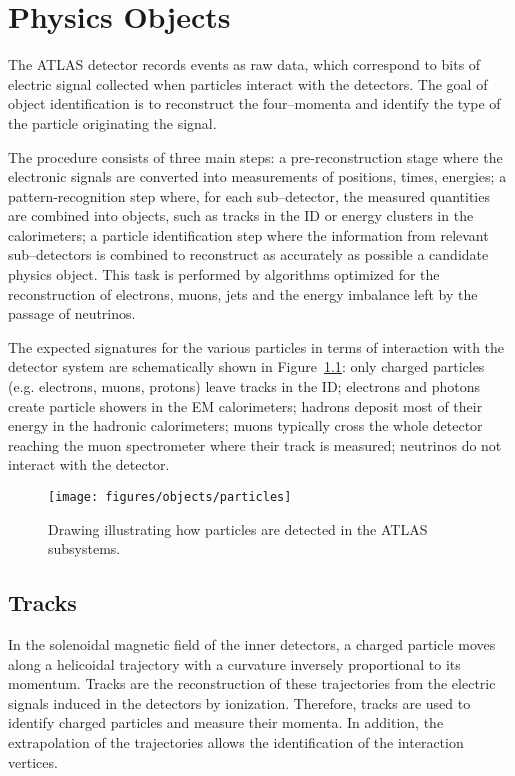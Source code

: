 \chapter{Physics Objects}
\label{sec:objects}

The ATLAS detector records events as raw data, 
which correspond to bits of electric signal collected 
when particles interact with the detectors. 
The goal of object identification is to reconstruct the four--momenta
and identify the type of the particle originating the signal.

The procedure consists of three main steps: a pre-reconstruction stage
where the electronic signals are converted into measurements of
positions, times, energies; a pattern-recognition step where, for each
sub--detector, the measured quantities are combined into objects, such
as tracks in the ID or energy clusters in the calorimeters; a particle
identification step where the information from relevant sub--detectors
is combined to reconstruct as accurately as possible a candidate
physics object. This task is performed by algorithms optimized for the
reconstruction of electrons, muons, jets and the energy imbalance left
by the passage of neutrinos. 

The expected signatures for the various particles in terms of
interaction with the detector system are schematically shown in
Figure~\ref{fig:decaychart}: only charged particles (e.g. electrons,
muons, protons) leave tracks in the ID; electrons and photons create
particle showers in the EM calorimeters; hadrons deposit most of their
energy in the hadronic calorimeters; muons typically cross the whole
detector reaching the muon spectrometer where their track is measured;
neutrinos do not interact with the detector.

\begin{figure}[tb]\centering
  \texttt{[image: figures/objects/particles]}
  \caption{Drawing illustrating how particles are detected in the ATLAS subsystems.}
  \label{fig:decaychart}
\end{figure}

\section{Tracks}
\label{sec:tracks}

In the solenoidal magnetic field of the inner detectors,
a charged particle moves along a helicoidal trajectory with a 
curvature inversely proportional to its momentum.
Tracks are the reconstruction of these trajectories from the electric 
signals induced in the detectors by ionization.
Therefore, tracks are used to identify charged particles and measure
their momenta. In addition, the extrapolation of the trajectories
allows the identification of the interaction vertices.
 

